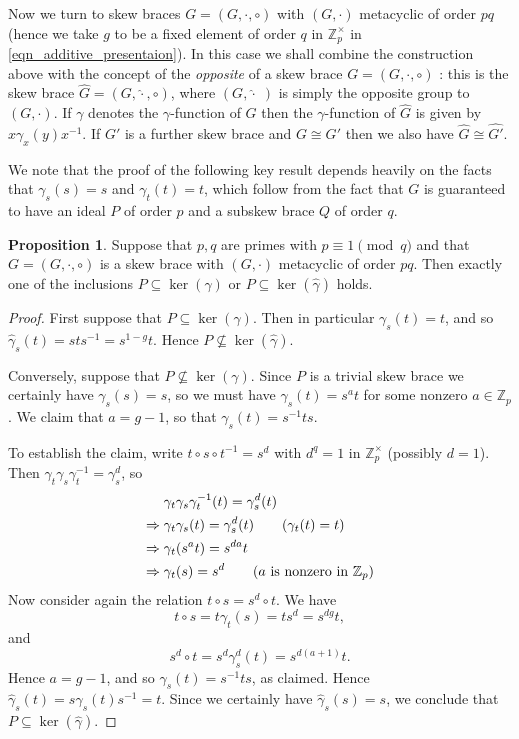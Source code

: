 \documentclass[12pt,a4paper, reqno]{amsart}
\theoremstyle{definition}
\newtheorem{proposition}[theorem]{Proposition}
\newcommand{\Z}{\mathbb{Z}}
\renewcommand{\hat}{\widehat}
\begin{document}
Now we turn to skew braces $ G=(G,\cdot,\circ) $ with $ (G,\cdot) $ metacyclic of order $ pq $ (hence we take $ g $ to be a fixed element of order $ q $ in $ \Z_{p}^{\times} $ in \eqref{eqn_additive_presentaion}). In this case we shall combine the construction above with the concept of the \textit{opposite} of a skew brace $ G=(G,\cdot,\circ) $ \cite{KT20}: this is the skew brace $ \hat{G} = (G,\hat{\cdot},\circ) $, where $ (G,\hat{\cdot} \;) $ is simply the opposite group to $ (G,\cdot) $. If $ \gamma $ denotes the $ \gamma $-function of $ G $ then the $ \gamma $-function of $ \hat{G} $ is given by $ x\gamma_{x}(y)x^{-1} $. If $ G' $ is a further skew brace and $ G \cong G' $ then we also have $ \hat{G} \cong \hat{G'} $. 

We note that the proof of the following key result depends heavily on the facts that $ \gamma_{s}(s)=s $ and $ \gamma_{t}(t)=t $, which follow from the fact that $ G $ is guaranteed to have an ideal $ P $ of order $ p $ and a subskew brace $ Q $ of order $ q $. 

\begin{proposition} \label{prop_ker_gamma}
Suppose that $ p,q $ are primes with $ p \equiv 1 \pmod{q} $ and that $ G = (G,\cdot,\circ) $ is a skew brace with $ (G,\cdot) $ metacyclic of order $ pq $. Then exactly one of the inclusions $ P \subseteq \ker(\gamma) $ or $ P \subseteq \ker(\hat{\gamma}) $ holds. 
\end{proposition}
\begin{proof}
First suppose that $ P \subseteq \ker(\gamma) $. Then in particular $ \gamma_{s}(t) = t $, and so $ \hat{\gamma}_{s}(t) = sts^{-1} = s^{1-g}t $. Hence $ P \not \subseteq \ker(\hat{\gamma}) $. 

Conversely, suppose that $ P \not \subseteq \ker(\gamma) $. Since $ P $ is a trivial skew brace we certainly have $ \gamma_{s}(s)=s $, so we must have $ \gamma_{s}(t) = s^{a}t $ for some nonzero $ a \in \Z_{p} $. We claim that $ a=g-1 $, so that $ \gamma_{s}(t) = s^{-1}ts $. 

To establish the claim, write $ t \circ s \circ t^{-1} = s^{d} $ with $ d^{q} = 1 $ in $ \Z_{p}^{\times} $ (possibly $ d=1 $). Then $ \gamma_{t}\gamma_{s}\gamma_{t}^{-1} = \gamma_{s}^{d} $, so 
\begin{align*}
& \gamma_{t}\gamma_{s}\gamma_{t}^{-1}(t) = \gamma_{s}^{d}(t) \\
\Rightarrow \; & \gamma_{t}\gamma_{s}(t) = \gamma_{s}^{d}(t) \tag{$\gamma_{t}(t)=t$} \\
\Rightarrow \; & \gamma_{t}(s^{a}t) = s^{da}t \\
\Rightarrow \; & \gamma_{t}(s)=s^{d} \tag{$ a $ is nonzero in $ \Z_{p} $}
\end{align*}
Now consider again the relation $ t \circ s = s^{d} \circ t $. We have
\[ t \circ s = t \gamma_{t}(s) = ts^{d} = s^{dg}t, \]
and
\[ s^{d} \circ t = s^{d} \gamma_{s}^{d}(t) = s^{d(a+1)}t. \]
Hence $ a=g-1 $, and so $ \gamma_{s}(t) = s^{-1}ts $, as claimed. Hence $ \hat{\gamma}_{s}(t) = s\gamma_{s}(t)s^{-1} = t $. Since we certainly have $ \hat{\gamma}_{s}(s) = s $, we conclude that $ P \subseteq \ker(\hat{\gamma}) $.  
\end{proof}
\end{document}
